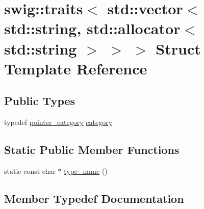 \hypertarget{structswig_1_1traits_3_01std_1_1vector_3_01std_1_1string_00_01std_1_1allocator_3_01std_1_1string_01_4_01_4_01_4}{}\section{swig\+:\+:traits$<$ std\+:\+:vector$<$ std\+:\+:string, std\+:\+:allocator$<$ std\+:\+:string $>$ $>$ $>$ Struct Template Reference}
\label{structswig_1_1traits_3_01std_1_1vector_3_01std_1_1string_00_01std_1_1allocator_3_01std_1_1string_01_4_01_4_01_4}
\subsection*{Public Types}
\begin{DoxyCompactItemize}
\item 
typedef \hyperlink{structswig_1_1pointer__category}{pointer\+\_\+category} \hyperlink{structswig_1_1traits_3_01std_1_1vector_3_01std_1_1string_00_01std_1_1allocator_3_01std_1_1string_01_4_01_4_01_4_a888c5f49b4d76c1791d18b280dc89af6}{category}
\end{DoxyCompactItemize}
\subsection*{Static Public Member Functions}
\begin{DoxyCompactItemize}
\item 
static const char $\ast$ \hyperlink{structswig_1_1traits_3_01std_1_1vector_3_01std_1_1string_00_01std_1_1allocator_3_01std_1_1string_01_4_01_4_01_4_a9196f04cf4a0e459d368b9f457bb96f0}{type\+\_\+name} ()
\end{DoxyCompactItemize}


\subsection{Member Typedef Documentation}
\mbox{\label{structswig_1_1traits_3_01std_1_1vector_3_01std_1_1string_00_01std_1_1allocator_3_01std_1_1string_01_4_01_4_01_4_a888c5f49b4d76c1791d18b280dc89af6}} 

